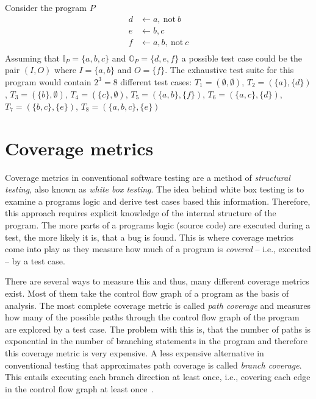 \begin{example}
\label{ex:test suite}
    Consider the program $P$
    \begin{align*}
        d &\leftarrow a,\ \text{not}\ b \\
        e &\leftarrow b, c \\
        f &\leftarrow a, b,\ \text{not}\ c \\
    \end{align*}
    Assuming that \(\mathbb{I}_P = \{a, b, c\}\) and \(\mathbb{O}_P = \{d, e, f\}\) a possible test case could be the pair \((I, O)\) where \(I = \{a, b\}\) and \(O = \{f\}\).
    The exhaustive test suite for this program would contain \(2^3 = 8\) different test cases: \(T_1 = (\emptyset, \emptyset)\), \(T_2 = (\{a\}, \{d\})\), \(T_3 
 = (\{b\}, \emptyset)\), \(T_4 = (\{c\}, \emptyset)\), \(T_5 = (\{a, b\}, \{f\})\), \(T_6 = (\{a, c\}, \{d\})\), \(T_7 = (\{b, c\}, \{e\})\), \(T_8 = (\{a, b, c\}, \{e\})\)
\end{example}

\begin{comment}
- maybe Specification -> the correct (expected) output for every input, what does it mean for a program to "pass/be compliant 
with" a testcase, when is a program "correct" with respect to a specification (not actually needed for coverage as coverage 
does not care about specification!)    
\end{comment}


\chapter{Coverage metrics}
\label{ch:Coverage metrics}
Coverage metrics in conventional software testing are a method of \emph{structural testing}, also known as \emph{white box testing}. The idea behind white box testing is to examine a programs logic and derive test cases based this information. Therefore, this approach requires explicit knowledge of the internal structure of the program. The more parts of a programs logic (source code) are executed during a test, the more likely it is, that a bug is found. This is where coverage metrics come into play as they measure how much of a program is \emph{covered} -- i.e., executed -- by a test case.

There are several ways to measure this and thus, many different coverage metrics exist. Most of them take the control flow graph of a program as the basis of analysis. The most complete coverage metric is called \emph{path coverage} and measures how many of the possible paths through the control flow graph of the program are explored by a test case. The problem with this is, that the number of paths is exponential in the number of branching statements in the program and therefore this coverage metric is very expensive. A less expensive alternative in conventional testing that approximates path coverage is called \emph{branch coverage}. This entails executing each branch direction at least once, i.e., covering each edge in the control flow graph at least once~\cite[41\psqq]{MSB12}.

